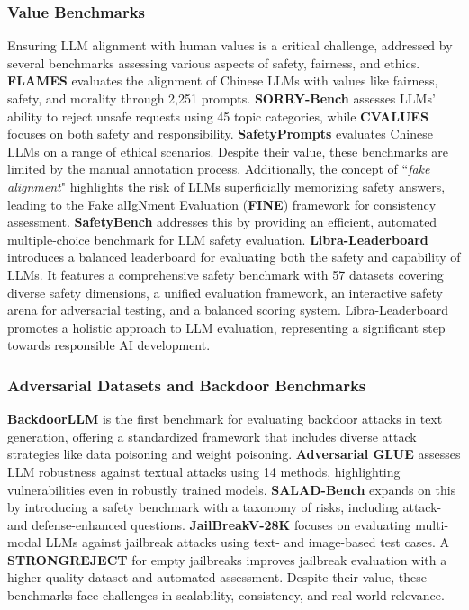 \subsubsection{Value Benchmarks}
Ensuring LLM alignment with human values is a critical challenge, addressed by several benchmarks assessing various aspects of safety, fairness, and ethics. \textbf{FLAMES} \cite{huang2024flames} evaluates the alignment of Chinese LLMs with values like fairness, safety, and morality through 2,251 prompts. \textbf{SORRY-Bench} \cite{xie2024sorry} assesses LLMs' ability to reject unsafe requests using 45 topic categories, while \textbf{CVALUES} \cite{xu2023cvalues} focuses on both safety and responsibility. \textbf{SafetyPrompts} \cite{sun2023safety} evaluates Chinese LLMs on a range of ethical scenarios. Despite their value, these benchmarks are limited by the manual annotation process. Additionally, the concept of ``\emph{fake alignment}" \cite{wang2024fake} highlights the risk of LLMs superficially memorizing safety answers, leading to the Fake alIgNment Evaluation (\textbf{FINE}) framework for consistency assessment. \textbf{SafetyBench} \cite{zhang2024safetybench} addresses this by providing an efficient, automated multiple-choice benchmark for LLM safety evaluation.
\textbf{Libra-Leaderboard}\cite{li2024libra} introduces a balanced leaderboard for evaluating both the safety and capability of LLMs. 
It features a comprehensive safety benchmark with 57 datasets covering diverse safety dimensions, a unified evaluation framework, an interactive safety arena for adversarial testing, and a balanced scoring system. Libra-Leaderboard promotes a holistic approach to LLM evaluation, representing a significant step towards responsible AI development.

\subsubsection{Adversarial Datasets and Backdoor Benchmarks}
\textbf{BackdoorLLM} \cite{li2024backdoorllm} is the first benchmark for evaluating backdoor attacks in text generation, offering a standardized framework that includes diverse attack strategies like data poisoning and weight poisoning. \textbf{Adversarial GLUE} \cite{wang2021adversarial} assesses LLM robustness against textual attacks using 14 methods, highlighting vulnerabilities even in robustly trained models. \textbf{SALAD-Bench} \cite{li2024salad} expands on this by introducing a safety benchmark with a taxonomy of risks, including attack- and defense-enhanced questions. \textbf{JailBreakV-28K} \cite{luo2024jailbreakv} focuses on evaluating multi-modal LLMs against jailbreak attacks using text- and image-based test cases. A \textbf{STRONGREJECT} for empty jailbreaks \cite{souly2024strongreject} improves jailbreak evaluation with a higher-quality dataset and automated assessment. Despite their value, these benchmarks face challenges in scalability, consistency, and real-world relevance.